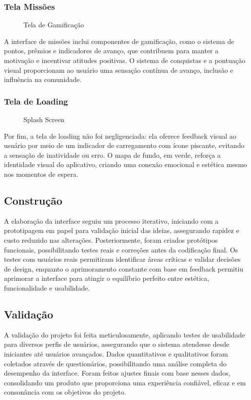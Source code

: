 \documentclass[a4paper, 12pt]{article}
\begin{document}
\subsubsection{Tela Missões}

\begin{figure}[H]
  \centering
  \caption{Tela de Gamificação}
  \label{fig:missao}
\end{figure}

A interface de missões inclui componentes de gamificação, como o sistema de pontos, prêmios e indicadores de avanço, que contribuem para manter a motivação e incentivar atitudes positivas.  O sistema de conquistas e a pontuação visual proporcionam ao usuário uma sensação contínua de avanço, inclusão e influência na comunidade.

\subsubsection{Tela de Loading}

\begin{figure}[H]
  \centering
  \caption{Splash Screen}
  \label{fig:loading}
\end{figure}

Por fim, a tela de loading não foi negligenciada: ela oferece feedback visual ao usuário por meio de um indicador de carregamento com ícone piscante, evitando a sensação de inatividade ou erro. O mapa de fundo, em verde, reforça a identidade visual do aplicativo, criando uma conexão emocional e estética mesmo nos momentos de espera.

\subsection{Construção}

A elaboração da interface seguiu um processo iterativo, iniciando com a prototipagem em papel para validação inicial das ideias, assegurando rapidez e custo reduzido nas alterações. Posteriormente, foram criados protótipos funcionais, possibilitando testes reais e correções antes da codificação final. Os testes com usuários reais permitiram identificar áreas críticas e validar decisões de design, enquanto o aprimoramento constante com base em feedback permitiu aprimorar a interface para atingir o equilíbrio perfeito entre estética, funcionalidade e usabilidade.

\subsection{Validação}
A validação do projeto foi feita meticulosamente, aplicando testes de usabilidade para diversos perfis de usuários, assegurando que o sistema atendesse desde iniciantes até usuários avançados. Dados quantitativos e qualitativos foram coletados através de questionários, possibilitando uma análise completa do desempenho da interface. Foram feitos ajustes finais com base nesses dados, consolidando um produto que proporciona uma experiência confiável, eficaz e em consonância com os objetivos do projeto.
\end{document}
